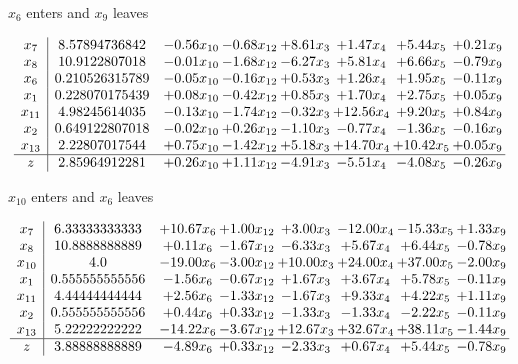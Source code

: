 \documentclass[8pt]{article}
\begin{document}
 $ x_{6} $ enters and $ x_{9} $ leaves 

 \[\begin{array}{c| c c@{\hskip 2pt} c@{\hskip 2pt} c@{\hskip 2pt} c@{\hskip 2pt} c@{\hskip 2pt} c@{\hskip 2pt} }
 x_{7}   &  8.57894736842 & -0.56 x_{10} & -0.68 x_{12} & +  8.61 x_{3} & +  1.47 x_{4} & +  5.44 x_{5} & +  0.21 x_{9}\\
 x_{8}   &  10.9122807018 & -0.01 x_{10} & -1.68 x_{12} & -6.27 x_{3} & +  5.81 x_{4} & +  6.66 x_{5} & -0.79 x_{9}\\
 x_{6}   &  0.210526315789 & -0.05 x_{10} & -0.16 x_{12} & +  0.53 x_{3} & +  1.26 x_{4} & +  1.95 x_{5} & -0.11 x_{9}\\
 x_{1}   &  0.228070175439 & +  0.08 x_{10} & -0.42 x_{12} & +  0.85 x_{3} & +  1.70 x_{4} & +  2.75 x_{5} & +  0.05 x_{9}\\
 x_{11}   &  4.98245614035 & -0.13 x_{10} & -1.74 x_{12} & -0.32 x_{3} & + 12.56 x_{4} & +  9.20 x_{5} & +  0.84 x_{9}\\
 x_{2}   &  0.649122807018 & -0.02 x_{10} & +  0.26 x_{12} & -1.10 x_{3} & -0.77 x_{4} & -1.36 x_{5} & -0.16 x_{9}\\
 x_{13}   &  2.22807017544 & +  0.75 x_{10} & -1.42 x_{12} & +  5.18 x_{3} & + 14.70 x_{4} & + 10.42 x_{5} & +  0.05 x_{9}\\
\hline
z    &  2.85964912281 & +  0.26 x_{10} & +  1.11 x_{12} & -4.91 x_{3} & -5.51 x_{4} & -4.08 x_{5} & -0.26 x_{9}\\
\end{array}\]


 $ x_{10} $ enters and $ x_{6} $ leaves 

 \[\begin{array}{c| c c@{\hskip 2pt} c@{\hskip 2pt} c@{\hskip 2pt} c@{\hskip 2pt} c@{\hskip 2pt} c@{\hskip 2pt} }
 x_{7}   &  6.33333333333 & + 10.67 x_{6} & +  1.00 x_{12} & +  3.00 x_{3} & -12.00 x_{4} & -15.33 x_{5} & +  1.33 x_{9}\\
 x_{8}   &  10.8888888889 & +  0.11 x_{6} & -1.67 x_{12} & -6.33 x_{3} & +  5.67 x_{4} & +  6.44 x_{5} & -0.78 x_{9}\\
 x_{10}   &  4.0 & -19.00 x_{6} & -3.00 x_{12} & + 10.00 x_{3} & + 24.00 x_{4} & + 37.00 x_{5} & -2.00 x_{9}\\
 x_{1}   &  0.555555555556 & -1.56 x_{6} & -0.67 x_{12} & +  1.67 x_{3} & +  3.67 x_{4} & +  5.78 x_{5} & -0.11 x_{9}\\
 x_{11}   &  4.44444444444 & +  2.56 x_{6} & -1.33 x_{12} & -1.67 x_{3} & +  9.33 x_{4} & +  4.22 x_{5} & +  1.11 x_{9}\\
 x_{2}   &  0.555555555556 & +  0.44 x_{6} & +  0.33 x_{12} & -1.33 x_{3} & -1.33 x_{4} & -2.22 x_{5} & -0.11 x_{9}\\
 x_{13}   &  5.22222222222 & -14.22 x_{6} & -3.67 x_{12} & + 12.67 x_{3} & + 32.67 x_{4} & + 38.11 x_{5} & -1.44 x_{9}\\
\hline
z    &  3.88888888889 & -4.89 x_{6} & +  0.33 x_{12} & -2.33 x_{3} & +  0.67 x_{4} & +  5.44 x_{5} & -0.78 x_{9}\\
\end{array}\]
\end{document}
